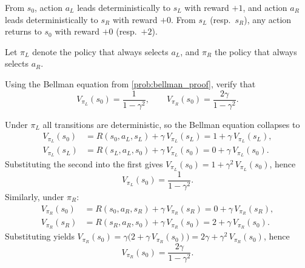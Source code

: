 \documentclass[11pt]{article}
\begin{document}
\begin{center}
\end{center}

From $s_0$, action $a_L$ leads deterministically to $s_L$ with reward $+1$, and action $a_R$ leads deterministically to $s_R$ with reward $+0$. From $s_L$ (resp.\ $s_R$), any action returns to $s_0$ with reward $+0$ (resp.\ $+2$).

Let $\pi_L$ denote the policy that always selects $a_L$, and $\pi_R$ the policy that always selects $a_R$.

\begin{exercise}
\label{prob:small_mdp_values} Using the Bellman equation from \cref{prob:bellman_proof}, verify that
$$
V_{\pi_L}(s_0) = \frac{1}{1-\gamma^2}, \qquad V_{\pi_R}(s_0) = \frac{2\gamma}{1-\gamma^2}.
$$
\end{exercise}

\begin{solution}
Under $\pi_L$ all transitions are deterministic, so the Bellman equation collapses to
\begin{align*}
V_{\pi_L}(s_0) &= R(s_0, a_L, s_L) + \gamma\, V_{\pi_L}(s_L) = 1 + \gamma\, V_{\pi_L}(s_L), \\
V_{\pi_L}(s_L) &= R(s_L, a_L, s_0) + \gamma\, V_{\pi_L}(s_0) = 0 + \gamma\, V_{\pi_L}(s_0).
\end{align*}
Substituting the second into the first gives $V_{\pi_L}(s_0) = 1 + \gamma^2\, V_{\pi_L}(s_0)$, hence
$$
V_{\pi_L}(s_0) = \frac{1}{1-\gamma^2}.
$$
Similarly, under $\pi_R$:
\begin{align*}
V_{\pi_R}(s_0) &= R(s_0, a_R, s_R) + \gamma\, V_{\pi_R}(s_R) = 0 + \gamma\, V_{\pi_R}(s_R), \\
V_{\pi_R}(s_R) &= R(s_R, a_R, s_0) + \gamma\, V_{\pi_R}(s_0) = 2 + \gamma\, V_{\pi_R}(s_0).
\end{align*}
Substituting yields $V_{\pi_R}(s_0) = \gamma\bigl(2 + \gamma\, V_{\pi_R}(s_0)\bigr) = 2\gamma + \gamma^2\, V_{\pi_R}(s_0)$, hence
$$
V_{\pi_R}(s_0) = \frac{2\gamma}{1-\gamma^2}.
$$
\end{solution}
\end{document}

